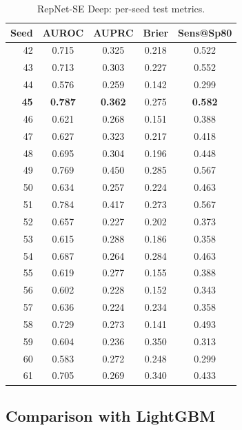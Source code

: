 \documentclass[11pt,a4paper]{article}
\begin{document}
\begin{table}[H]
\centering
\caption{RepNet-SE Deep: per-seed test metrics.}
\label{tab:perseed}
\begin{tabular}{rcccc}
\toprule
\textbf{Seed} & \textbf{AUROC} & \textbf{AUPRC} & \textbf{Brier} & \textbf{Sens@Sp80} \\
\midrule
42 & 0.715 & 0.325 & 0.218 & 0.522 \\
43 & 0.713 & 0.303 & 0.227 & 0.552 \\
44 & 0.576 & 0.259 & 0.142 & 0.299 \\
\textbf{45} & \textbf{0.787} & \textbf{0.362} & 0.275 & \textbf{0.582} \\
46 & 0.621 & 0.268 & 0.151 & 0.388 \\
47 & 0.627 & 0.323 & 0.217 & 0.418 \\
48 & 0.695 & 0.304 & 0.196 & 0.448 \\
49 & 0.769 & 0.450 & 0.285 & 0.567 \\
50 & 0.634 & 0.257 & 0.224 & 0.463 \\
51 & 0.784 & 0.417 & 0.273 & 0.567 \\
52 & 0.657 & 0.227 & 0.202 & 0.373 \\
53 & 0.615 & 0.288 & 0.186 & 0.358 \\
54 & 0.687 & 0.264 & 0.284 & 0.463 \\
55 & 0.619 & 0.277 & 0.155 & 0.388 \\
56 & 0.602 & 0.228 & 0.152 & 0.343 \\
57 & 0.636 & 0.224 & 0.234 & 0.358 \\
58 & 0.729 & 0.273 & 0.141 & 0.493 \\
59 & 0.604 & 0.236 & 0.350 & 0.313 \\
60 & 0.583 & 0.272 & 0.248 & 0.299 \\
61 & 0.705 & 0.269 & 0.340 & 0.433 \\
\bottomrule
\end{tabular}
\end{table}

\subsection{Comparison with LightGBM}
\end{document}
